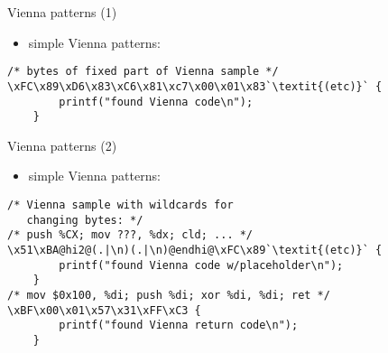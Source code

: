 
\begin{frame}[fragile,label=ViennaPat1]{Vienna patterns (1)}
\begin{itemize}
\item simple Vienna patterns:
\end{itemize}
\begin{lstlisting}
/* bytes of fixed part of Vienna sample */
\xFC\x89\xD6\x83\xC6\x81\xc7\x00\x01\x83`\textit{(etc)}` {
        printf("found Vienna code\n");
    }
\end{lstlisting}
\end{frame}


\begin{frame}[fragile,label=ViennaPat2]{Vienna patterns (2)}
\begin{itemize}
\item simple Vienna patterns:
\end{itemize}
\begin{lstlisting}
/* Vienna sample with wildcards for
   changing bytes: */
/* push %CX; mov ???, %dx; cld; ... */
\x51\xBA@hi2@(.|\n)(.|\n)@endhi@\xFC\x89`\textit{(etc)}` {
        printf("found Vienna code w/placeholder\n");
    }
/* mov $0x100, %di; push %di; xor %di, %di; ret */
\xBF\x00\x01\x57\x31\xFF\xC3 {
        printf("found Vienna return code\n");
    }
\end{lstlisting}
\end{frame}



